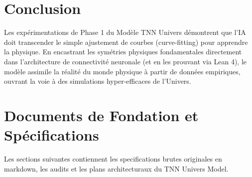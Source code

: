 \documentclass[11pt,a4paper]{article}
\begin{document}
\section{Conclusion}
Les expérimentations de Phase 1 du Modèle TNN Univers démontrent que l'IA doit transcender le simple ajustement de courbes (curve-fitting) pour apprendre la physique. En encastrant les symétries physiques fondamentales directement dans l'architecture de connectivité neuronale (et en les prouvant via Lean 4), le modèle assimile la réalité du monde physique à partir de données empiriques, ouvrant la voie à des simulations hyper-efficaces de l'Univers.


\newpage
\appendix
\section{Documents de Fondation et Sp\'{e}cifications}
Les sections suivantes contiennent les specifications brutes originales en markdown, les audits et les plans architecturaux du TNN Univers Model.
\end{document}
